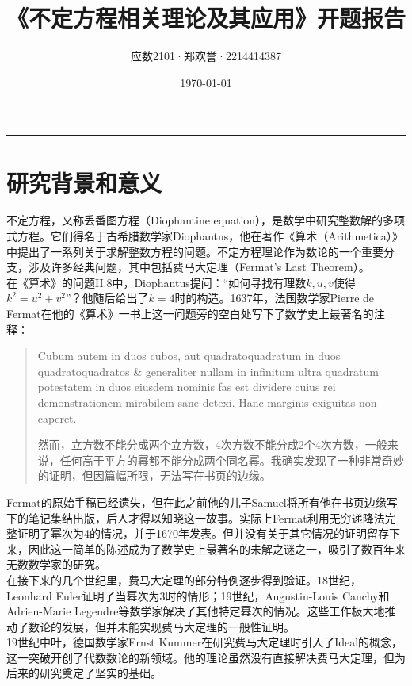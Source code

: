 \documentclass{article}
\title{《不定方程相关理论及其应用》开题报告}
\author{应数2101·郑欢誉·2214414387}
\date{\today}
\begin{document}
\maketitle

\hrule

\section{研究背景和意义}

\noindent
不定方程，又称丢番图方程（Diophantine equation），是数学中研究整数解的多项式方程。它们得名于古希腊数学家Diophantus，他在著作《算术（Arithmetica）》中提出了一系列关于求解整数方程的问题。不定方程理论作为数论的一个重要分支，涉及许多经典问题，其中包括费马大定理（Fermat's Last Theorem）。\\

\noindent
在《算术》的问题II.8中，Diophantus提问：“如何寻找有理数$k,u,v$使得$k^2=u^2+v^2$”？他随后给出了$k=4$时的构造。1637年，法国数学家Pierre de Fermat在他的《算术》一书上这一问题旁的空白处写下了数学史上最著名的注释：

\begin{quote}
Cubum autem in duos cubos, aut quadratoquadratum in duos quadratoquadratos \& generaliter nullam in infinitum ultra quadratum potestatem in duos eiusdem nominis fas est dividere cuius rei demonstrationem mirabilem sane detexi. Hanc marginis exiguitas non caperet. 

然而，立方数不能分成两个立方数，4次方数不能分成2个4次方数，一般来说，任何高于平方的幂都不能分成两个同名幂。我确实发现了一种非常奇妙的证明，但因篇幅所限，无法写在书页的边缘。
\end{quote}

\noindent
Fermat的原始手稿已经遗失，但在此之前他的儿子Samuel将所有他在书页边缘写下的笔记集结出版，后人才得以知晓这一故事。实际上Fermat利用无穷递降法完整证明了幂次为4的情况，并于1670年发表。但并没有关于其它情况的证明留存下来，因此这一简单的陈述成为了数学史上最著名的未解之谜之一，吸引了数百年来无数数学家的研究。\\

\noindent
在接下来的几个世纪里，费马大定理的部分特例逐步得到验证。18世纪，Leonhard Euler证明了当幂次为3时的情形；19世纪，Augustin-Louis Cauchy和Adrien-Marie Legendre等数学家解决了其他特定幂次的情况。这些工作极大地推动了数论的发展，但并未能实现费马大定理的一般性证明。\\

\noindent
19世纪中叶，德国数学家Ernst Kummer在研究费马大定理时引入了Ideal的概念，这一突破开创了代数数论的新领域。他的理论虽然没有直接解决费马大定理，但为后来的研究奠定了坚实的基础。\\
\end{document}
